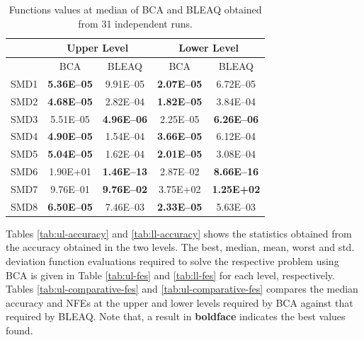 \documentclass[conference]{IEEEtran}
\begin{document}
\begin{table}[!ht]
\renewcommand{\arraystretch}{1.3}
    \caption{Functions values at median of BCA and BLEAQ obtained from 31 independent runs.}
    \label{tab:ll-comparative-vals}
    \centering
    \begin{tabular}{|c|c|c||c|c|}
\hline
& \multicolumn{2}{c||}{Upper Level} & \multicolumn{2}{c|}{Lower Level} \\ \hline
& BCA & BLEAQ & BCA & BLEAQ \\ \hline
SMD1  & \textbf{5.36E--05} & 9.91E--05 & \textbf{2.07E--05} & 6.72E--05 \\ \hline
SMD2  & \textbf{4.68E--05} & 2.82E--04 & \textbf{1.82E--05} & 3.84E--04 \\ \hline
SMD3  & 5.51E--05 & \textbf{4.96E--06} & 2.25E--05 & \textbf{6.26E--06} \\ \hline
SMD4  & \textbf{4.90E--05} & 1.54E--04 & \textbf{3.66E--05} & 6.12E--04 \\ \hline
SMD5  & \textbf{5.04E--05} & 1.62E--04 & \textbf{2.01E--05} & 3.08E--04 \\ \hline
SMD6  &  1.90E+01 & \textbf{1.46E--13} & 2.87E--02 & \textbf{8.66E--16} \\ \hline
SMD7  & 9.76E--01 & \textbf{9.76E--02} &  3.75E+02 &  \textbf{1.25E+02} \\ \hline
SMD8  & \textbf{6.50E--05} & 7.46E--03 & \textbf{2.33E--05} & 5.63E--03 \\ \hline

    \end{tabular}
\end{table}






Tables \ref{tab:ul-accuracy} and \ref{tab:ll-accuracy} shows the statistics
obtained from the accuracy obtained in the two levels. The best, median, mean,
worst and std. deviation function evaluations required to solve the respective
problem using BCA is given in Table \ref{tab:ul-fes} and \ref{tab:ll-fes} for
each level, respectively. Tables \ref{tab:ul-comparative-fes} and \ref{tab:ul-comparative-fes}
compares the median accuracy and NFEs at the upper and lower levels required by
BCA against that required by BLEAQ. Note that, a result in \textbf{boldface} indicates
the best values found.
\end{document}
